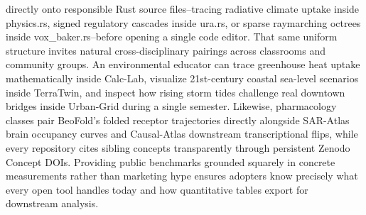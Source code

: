 \documentclass[10pt,letterpaper]{article}
\begin{document}
directly onto responsible Rust source files--tracing radiative climate uptake inside physics.rs, signed regulatory cascades inside ura.rs, or sparse raymarching octrees inside vox\_baker.rs--before opening a single code editor. That same uniform structure invites natural cross-disciplinary pairings across classrooms and community groups. An environmental educator can trace greenhouse heat uptake mathematically inside Calc-Lab, visualize 21st-century coastal sea-level scenarios inside TerraTwin, and inspect how rising storm tides challenge real downtown bridges inside Urban-Grid during a single semester. Likewise, pharmacology classes pair BeoFold's folded receptor trajectories directly alongside SAR-Atlas brain occupancy curves and Causal-Atlas downstream transcriptional flips, while every repository cites sibling concepts transparently through persistent Zenodo Concept DOIs. Providing public benchmarks grounded squarely in concrete measurements rather than marketing hype ensures adopters know precisely what every open tool handles today and how quantitative tables export for downstream analysis.
\end{document}
